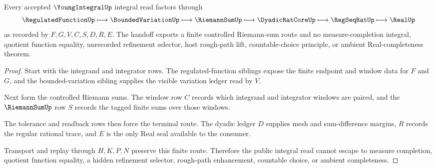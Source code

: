 \begin{theorem}
\label{thm:young-integral-riemann-sum-handoff}
Every accepted $\YoungIntegralUp$ integral read factors through
$$
\RegulatedFunctionUp \longmapsto \BoundedVariationUp \longmapsto \RiemannSumUp \longmapsto \DyadicRatCoreUp \longmapsto \RegSeqRatUp \longmapsto \RealUp
$$
as recorded by $F,G,V,C,S,D,R,E$. The handoff exports a finite controlled Riemann-sum route and no measure-completion integral, quotient function equality, unrecorded refinement selector, host rough-path lift, countable-choice principle, or ambient Real-completeness theorem.
\end{theorem}
\begin{proof}
Start with the integrand and integrator rows. The regulated-function siblings expose the finite endpoint and window data for $F$ and $G$, and the bounded-variation sibling supplies the visible variation ledger read by $V$.

Next form the controlled Riemann sums. The window row $C$ records which integrand and integrator windows are paired, and the $\RiemannSumUp$ row $S$ records the tagged finite sums over those windows.

The tolerance and readback rows then force the terminal route. The dyadic ledger $D$ supplies mesh and sum-difference margins, $R$ records the regular rational trace, and $E$ is the only Real seal available to the consumer.

Transport and replay through $H,K,P,N$ preserve this finite route. Therefore the public integral read cannot escape to measure completion, quotient function equality, a hidden refinement selector, rough-path enhancement, countable choice, or ambient completeness.
\end{proof}




